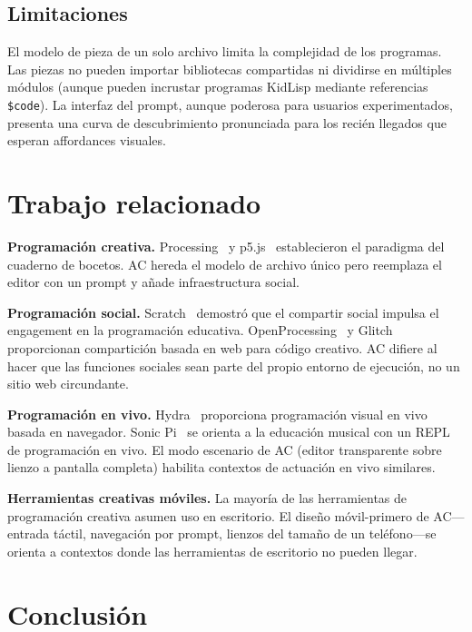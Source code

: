 \documentclass[10pt,letterpaper,twocolumn]{article}
\begin{document}
\subsection{Limitaciones}

El modelo de pieza de un solo archivo limita la complejidad de los programas. Las piezas no pueden importar bibliotecas compartidas ni dividirse en múltiples módulos (aunque pueden incrustar programas KidLisp mediante referencias \texttt{\$code}). La interfaz del prompt, aunque poderosa para usuarios experimentados, presenta una curva de descubrimiento pronunciada para los recién llegados que esperan affordances visuales.


\section{Trabajo relacionado}

\textbf{Programación creativa.} Processing~\citep{reas2007processing} y p5.js~\citep{mccarthy2015p5js} establecieron el paradigma del cuaderno de bocetos. AC hereda el modelo de archivo único pero reemplaza el editor con un prompt y añade infraestructura social.

\textbf{Programación social.} Scratch~\citep{resnick2009scratch} demostró que el compartir social impulsa el engagement en la programación educativa. OpenProcessing~\citep{openprocessing2009} y Glitch~\citep{glitch2017} proporcionan compartición basada en web para código creativo. AC difiere al hacer que las funciones sociales sean parte del propio entorno de ejecución, no un sitio web circundante.

\textbf{Programación en vivo.} Hydra~\citep{hydra2019} proporciona programación visual en vivo basada en navegador. Sonic Pi~\citep{aaron2016sonic} se orienta a la educación musical con un REPL de programación en vivo. El modo escenario de AC (editor transparente sobre lienzo a pantalla completa) habilita contextos de actuación en vivo similares.

\textbf{Herramientas creativas móviles.} La mayoría de las herramientas de programación creativa asumen uso en escritorio. El diseño móvil-primero de AC---entrada táctil, navegación por prompt, lienzos del tamaño de un teléfono---se orienta a contextos donde las herramientas de escritorio no pueden llegar.


\section{Conclusión}
\end{document}
